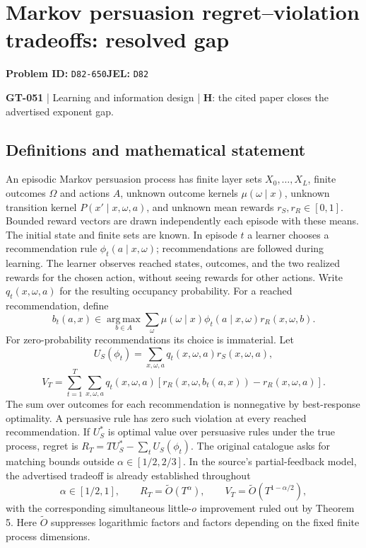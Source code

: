 \documentclass[11pt,a4paper]{article}
\begin{document}
\section*{Markov persuasion regret--violation tradeoffs: resolved gap}
\textbf{Problem ID:} \texttt{D82-650}\quad \textbf{JEL:} \texttt{D82}\par
\label{problem:OP-0181}
\label{game:GT-051}
{\sffamily\small\color{muted}
\textbf{GT-051} | Learning and information design | \textbf{H}: the cited paper closes the advertised exponent gap.
\par}
\subsection*{Definitions and mathematical statement}
An episodic Markov persuasion process has finite layer sets $X_0,\ldots,X_L$, finite outcomes $\Omega$ and actions $A$, unknown outcome kernels $\mu(\omega\mid x)$, unknown transition kernel $P(x'\mid x,\omega,a)$, and unknown mean rewards $r_S,r_R\in[0,1]$. Bounded reward vectors are drawn independently each episode with these means. The initial state and finite sets are known. In episode $t$ a learner chooses a recommendation rule $\phi_t(a\mid x,\omega)$; recommendations are followed during learning. The learner observes reached states, outcomes, and the two realized rewards for the chosen action, without seeing rewards for other actions. Write $q_t(x,\omega,a)$ for the resulting occupancy probability. For a reached recommendation, define
\[
 b_t(a,x)\in\operatorname*{arg\,max}_{b\in A}
 \sum_\omega\mu(\omega\mid x)\phi_t(a\mid x,\omega)r_R(x,\omega,b).
\]
For zero-probability recommendations its choice is immaterial. Let
\[
 U_S(\phi_t)=\sum_{x,\omega,a}q_t(x,\omega,a)r_S(x,\omega,a),
\]
\[
 V_T=\sum_{t=1}^T\sum_{x,\omega,a}q_t(x,\omega,a)
 [r_R(x,\omega,b_t(a,x))-r_R(x,\omega,a)].
\]
The sum over outcomes for each recommendation is nonnegative by best-response optimality. A persuasive rule has zero such violation at every reached recommendation. If $U_S^*$ is optimal value over persuasive rules under the true process, regret is $R_T=T U_S^*-\sum_tU_S(\phi_t)$. The original catalogue asks for matching bounds outside $\alpha\in[1/2,2/3]$. In the source's partial-feedback model, the advertised tradeoff is already established throughout
\[
 \alpha\in[1/2,1],\qquad
 R_T=\widetilde O(T^\alpha),\qquad V_T=\widetilde O(T^{1-\alpha/2}),
\]
with the corresponding simultaneous little-$o$ improvement ruled out by Theorem 5. Here $\widetilde O$ suppresses logarithmic factors and factors depending on the fixed finite process dimensions.
\end{document}
